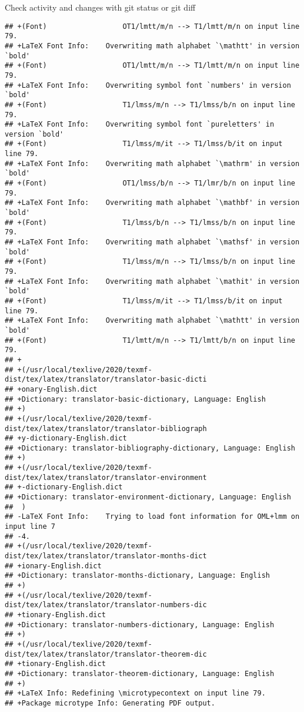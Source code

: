 \documentclass[ignorenonframetext,]{beamer}
\begin{document}
\begin{frame}[fragile]{Check activity and changes with git status or git
diff}
\begin{verbatim}
## +(Font)                  OT1/lmtt/m/n --> T1/lmtt/m/n on input line 79.
## +LaTeX Font Info:    Overwriting math alphabet `\mathtt' in version `bold'
## +(Font)                  OT1/lmtt/m/n --> T1/lmtt/m/n on input line 79.
## +LaTeX Font Info:    Overwriting symbol font `numbers' in version `bold'
## +(Font)                  T1/lmss/m/n --> T1/lmss/b/n on input line 79.
## +LaTeX Font Info:    Overwriting symbol font `pureletters' in version `bold'
## +(Font)                  T1/lmss/m/it --> T1/lmss/b/it on input line 79.
## +LaTeX Font Info:    Overwriting math alphabet `\mathrm' in version `bold'
## +(Font)                  OT1/lmss/b/n --> T1/lmr/b/n on input line 79.
## +LaTeX Font Info:    Overwriting math alphabet `\mathbf' in version `bold'
## +(Font)                  T1/lmss/b/n --> T1/lmss/b/n on input line 79.
## +LaTeX Font Info:    Overwriting math alphabet `\mathsf' in version `bold'
## +(Font)                  T1/lmss/m/n --> T1/lmss/b/n on input line 79.
## +LaTeX Font Info:    Overwriting math alphabet `\mathit' in version `bold'
## +(Font)                  T1/lmss/m/it --> T1/lmss/b/it on input line 79.
## +LaTeX Font Info:    Overwriting math alphabet `\mathtt' in version `bold'
## +(Font)                  T1/lmtt/m/n --> T1/lmtt/b/n on input line 79.
## +
## +(/usr/local/texlive/2020/texmf-dist/tex/latex/translator/translator-basic-dicti
## +onary-English.dict
## +Dictionary: translator-basic-dictionary, Language: English 
## +)
## +(/usr/local/texlive/2020/texmf-dist/tex/latex/translator/translator-bibliograph
## +y-dictionary-English.dict
## +Dictionary: translator-bibliography-dictionary, Language: English 
## +)
## +(/usr/local/texlive/2020/texmf-dist/tex/latex/translator/translator-environment
## +-dictionary-English.dict
## +Dictionary: translator-environment-dictionary, Language: English 
##  )
## -LaTeX Font Info:    Trying to load font information for OML+lmm on input line 7
## -4.
## +(/usr/local/texlive/2020/texmf-dist/tex/latex/translator/translator-months-dict
## +ionary-English.dict
## +Dictionary: translator-months-dictionary, Language: English 
## +)
## +(/usr/local/texlive/2020/texmf-dist/tex/latex/translator/translator-numbers-dic
## +tionary-English.dict
## +Dictionary: translator-numbers-dictionary, Language: English 
## +)
## +(/usr/local/texlive/2020/texmf-dist/tex/latex/translator/translator-theorem-dic
## +tionary-English.dict
## +Dictionary: translator-theorem-dictionary, Language: English 
## +)
## +LaTeX Info: Redefining \microtypecontext on input line 79.
## +Package microtype Info: Generating PDF output.

\end{verbatim}
\end{frame}
\end{document}
